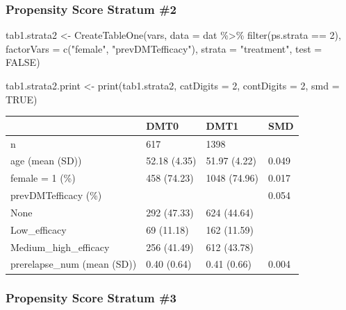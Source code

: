 \documentclass[
  letterpaper,
  DIV=11,
  numbers=noendperiod]{scrreprt}
\newenvironment{Shaded}{\begin{snugshade}}{\end{snugshade}}
\newcommand{\AttributeTok}[1]{\textcolor[rgb]{0.40,0.45,0.13}{#1}}
\newcommand{\ConstantTok}[1]{\textcolor[rgb]{0.56,0.35,0.01}{#1}}
\newcommand{\DecValTok}[1]{\textcolor[rgb]{0.68,0.00,0.00}{#1}}
\newcommand{\FunctionTok}[1]{\textcolor[rgb]{0.28,0.35,0.67}{#1}}
\newcommand{\NormalTok}[1]{\textcolor[rgb]{0.00,0.23,0.31}{#1}}
\newcommand{\OtherTok}[1]{\textcolor[rgb]{0.00,0.23,0.31}{#1}}
\newcommand{\SpecialCharTok}[1]{\textcolor[rgb]{0.37,0.37,0.37}{#1}}
\newcommand{\StringTok}[1]{\textcolor[rgb]{0.13,0.47,0.30}{#1}}
\begin{document}
\hypertarget{propensity-score-stratum-2}{%
\subsubsection{Propensity Score Stratum
\#2}\label{propensity-score-stratum-2}}

\begin{Shaded}
\begin{Highlighting}[]
\NormalTok{tab1.strata2 }\OtherTok{\textless{}{-}} \FunctionTok{CreateTableOne}\NormalTok{(vars, }\AttributeTok{data =}\NormalTok{ dat }\SpecialCharTok{\%\textgreater{}\%} \FunctionTok{filter}\NormalTok{(ps.strata }\SpecialCharTok{==} \DecValTok{2}\NormalTok{), }
                               \AttributeTok{factorVars =} \FunctionTok{c}\NormalTok{(}\StringTok{"female"}\NormalTok{, }\StringTok{"prevDMTefficacy"}\NormalTok{), }
                               \AttributeTok{strata =} \StringTok{"treatment"}\NormalTok{, }\AttributeTok{test =} \ConstantTok{FALSE}\NormalTok{)}

\NormalTok{tab1.strata2.print }\OtherTok{\textless{}{-}} \FunctionTok{print}\NormalTok{(tab1.strata2, }\AttributeTok{catDigits =} \DecValTok{2}\NormalTok{, }\AttributeTok{contDigits =} \DecValTok{2}\NormalTok{, }
                            \AttributeTok{smd =} \ConstantTok{TRUE}\NormalTok{)}
\end{Highlighting}
\end{Shaded}

\begin{longtable}[]{@{}llll@{}}
\toprule\noalign{}
& DMT0 & DMT1 & SMD \\
\midrule\noalign{}
\endhead
\bottomrule\noalign{}
\endlastfoot
n & 617 & 1398 & \\
age (mean (SD)) & 52.18 (4.35) & 51.97 (4.22) & 0.049 \\
female = 1 (\%) & 458 (74.23) & 1048 (74.96) & 0.017 \\
prevDMTefficacy (\%) & & & 0.054 \\
None & 292 (47.33) & 624 (44.64) & \\
Low\_efficacy & 69 (11.18) & 162 (11.59) & \\
Medium\_high\_efficacy & 256 (41.49) & 612 (43.78) & \\
prerelapse\_num (mean (SD)) & 0.40 (0.64) & 0.41 (0.66) & 0.004 \\
\end{longtable}

\hypertarget{propensity-score-stratum-3}{%
\subsubsection{Propensity Score Stratum
\#3}\label{propensity-score-stratum-3}}
\end{document}
